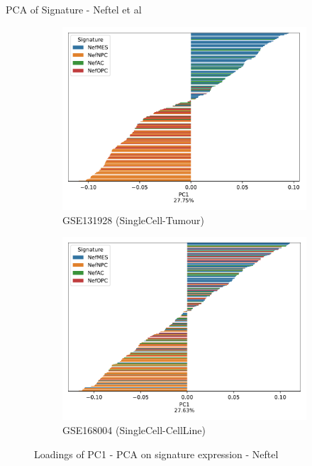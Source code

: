 \documentclass[aspectratio=169,9pt]{beamer}
\begin{document}
    \begin{frame}{PCA of Signature - Neftel et al}
        \begin{adjustwidth}{-5cm}{-5cm}
            \centering
            \begin{figure}\ContinuedFloat
                \centering
                \begin{subfigure}[c]{0.48\textwidth}
                    \centering
                    \includegraphics[width=\textwidth]{GSM3828672_loadings_barplot_Nef}
                    \caption{GSE131928 (SingleCell-Tumour)}
                \end{subfigure}
                \begin{subfigure}[c]{0.48\textwidth}
                    \centering
                    \includegraphics[width=\textwidth]{mgg23_loadings_barplot_Nef}
                    \caption{GSE168004 (SingleCell-CellLine)}
                \end{subfigure}
                \caption{Loadings of PC1 - PCA on signature expression - Neftel}
            \end{figure}
        \end{adjustwidth}
    \end{frame}
\end{document}
